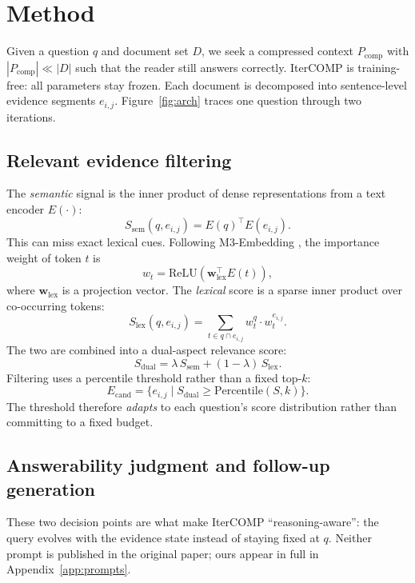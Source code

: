 \documentclass[11pt]{article}
\begin{document}
\section{Method}
\label{sec:method}


Given a question $q$ and document set $D$, we seek a compressed context
$P_{\text{comp}}$ with $|P_{\text{comp}}| \ll |D|$ such that the reader still
answers correctly. IterCOMP is training-free: all parameters stay frozen.
Each document is decomposed into sentence-level evidence segments $e_{i,j}$.
Figure~\ref{fig:arch} traces one question through two iterations.


\subsection{Relevant evidence filtering}
The \emph{semantic} signal is the inner product of dense representations from a
text encoder $E(\cdot)$:
\begin{equation}
S_{\text{sem}}(q, e_{i,j}) = E(q)^\top E(e_{i,j}).
\end{equation}
This can miss exact lexical cues. Following M3-Embedding
\citep{chen2024bgem3}, the importance weight of token $t$ is
\begin{equation}
w_t = \mathrm{ReLU}(\mathbf{w}_{\text{lex}}^\top E(t)),
\end{equation}
where $\mathbf{w}_{\text{lex}}$ is a projection vector. The \emph{lexical} score is a sparse
inner product over co-occurring tokens:
\begin{equation}
S_{\text{lex}}(q, e_{i,j}) = \sum_{t \in q \cap e_{i,j}} w_t^{q} \cdot w_t^{e_{i,j}}.
\end{equation}
The two are combined into a dual-aspect relevance score:
\begin{equation}
S_{\text{dual}} = \lambda \, S_{\text{sem}} + (1-\lambda) \, S_{\text{lex}}.
\label{eq:dual}
\end{equation}
Filtering uses a percentile threshold rather than a fixed top-$k$:
\begin{equation}
E_{\text{cand}} = \{ e_{i,j} \mid S_{\text{dual}} \ge \mathrm{Percentile}(S, k) \}.
\label{eq:pct}
\end{equation}
The threshold therefore \emph{adapts} to each question's score distribution
rather than committing to a fixed budget.

\subsection{Answerability judgment and follow-up generation}
These two decision points are what make IterCOMP
``reasoning-aware'': the query evolves with the evidence state instead of
staying fixed at $q$. Neither prompt is published in the original paper; ours
appear in full in Appendix~\ref{app:prompts}.
\end{document}
